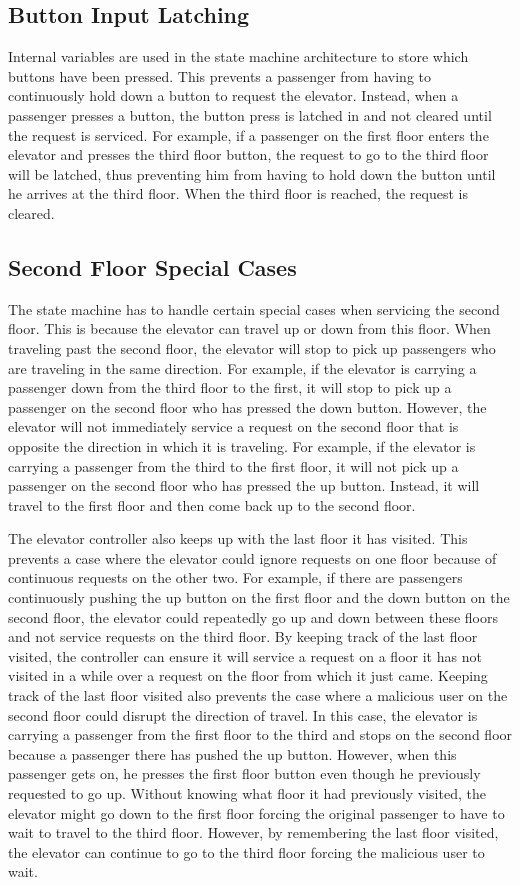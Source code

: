 \documentclass[journal]{IEEEtran}
\begin{document}
\subsection{Button Input Latching}
Internal variables are used in the state machine architecture to store which buttons have been pressed. This prevents a passenger from having to continuously hold down a button to request the elevator. Instead, when a passenger presses a button, the button press is latched in and not cleared until the request is serviced. For example, if a passenger on the first floor enters the elevator and presses the third floor button, the request to go to the third floor will be latched, thus preventing him from having to hold down the button until he arrives at the third floor. When the third floor is reached, the request is cleared.

\subsection{Second Floor Special Cases}
The state machine has to handle certain special cases when servicing the second floor. This is because the elevator can travel up or down from this floor. When traveling past the second floor, the elevator will stop to pick up passengers who are traveling in the same direction. For example, if the elevator is carrying a passenger down from the third floor to the first, it will stop to pick up a passenger on the second floor who has pressed the down button. However, the elevator will not immediately service a request on the second floor that is opposite the direction in which it is traveling. For example, if the elevator is carrying a passenger from the third to the first floor, it will not pick up a passenger on the second floor who has pressed the up button. Instead, it will travel to the first floor and then come back up to the second floor.

The elevator controller also keeps up with the last floor it has visited. This prevents a case where the elevator could ignore requests on one floor because of continuous requests on the other two. For example, if there are passengers continuously pushing the up button on the first floor and the down button on the second floor, the elevator could repeatedly go up and down between these floors and not service requests on the third floor. By keeping track of the last floor visited, the controller can ensure it will service a request on a floor it has not visited in a while over a request on the floor from which it just came. Keeping track of the last floor visited also prevents the case where a malicious user on the second floor could disrupt the direction of travel. In this case, the elevator is carrying a passenger from the first floor to the third and stops on the second floor because a passenger there has pushed the up button. However, when this passenger gets on, he presses the first floor button even though he previously requested to go up. Without knowing what floor it had previously visited, the elevator might go down to the first floor forcing the original passenger to have to wait to travel to the third floor. However, by remembering the last floor visited, the elevator can continue to go to the third floor forcing the malicious user to wait.
\end{document}
